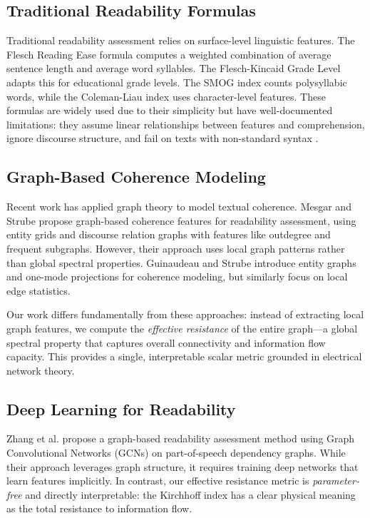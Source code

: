 \documentclass[11pt,letterpaper]{article}
\begin{document}
\subsection{Traditional Readability Formulas}

Traditional readability assessment relies on surface-level linguistic features. The Flesch Reading Ease formula \cite{Flesch1948} computes a weighted combination of average sentence length and average word syllables. The Flesch-Kincaid Grade Level \cite{Kincaid1975} adapts this for educational grade levels. The SMOG index \cite{McLaughlin1969} counts polysyllabic words, while the Coleman-Liau index \cite{Coleman1975} uses character-level features. These formulas are widely used due to their simplicity but have well-documented limitations: they assume linear relationships between features and comprehension, ignore discourse structure, and fail on texts with non-standard syntax \cite{Klein2025}.

\subsection{Graph-Based Coherence Modeling}

Recent work has applied graph theory to model textual coherence. Mesgar and Strube \cite{Mesgar2015} propose graph-based coherence features for readability assessment, using entity grids and discourse relation graphs with features like outdegree and frequent subgraphs. However, their approach uses local graph patterns rather than global spectral properties. Guinaudeau and Strube \cite{Guinaudeau2013} introduce entity graphs and one-mode projections for coherence modeling, but similarly focus on local edge statistics.

Our work differs fundamentally from these approaches: instead of extracting local graph features, we compute the \textit{effective resistance} of the entire graph---a global spectral property that captures overall connectivity and information flow capacity. This provides a single, interpretable scalar metric grounded in electrical network theory.

\subsection{Deep Learning for Readability}

Zhang et al. \cite{Zhang2026} propose a graph-based readability assessment method using Graph Convolutional Networks (GCNs) on part-of-speech dependency graphs. While their approach leverages graph structure, it requires training deep networks that learn features implicitly. In contrast, our effective resistance metric is \textit{parameter-free} and directly interpretable: the Kirchhoff index has a clear physical meaning as the total resistance to information flow.
\end{document}
